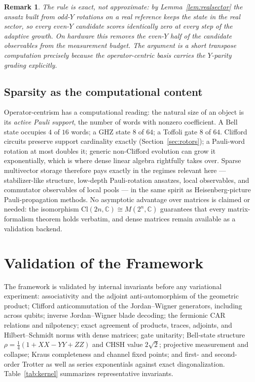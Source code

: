 \documentclass[11pt]{article}
\newcommand{\Cl}{\mathrm{Cl}}
\newcommand{\C}{\mathbb{C}}
\newtheorem{remark}{Remark}
\begin{document}
\begin{remark}
The rule is exact, not approximate: by Lemma~\ref{lem:realsector} the ansatz built from odd-$Y$ rotations on a real reference keeps the state in the real sector, so every even-$Y$ candidate scores identically zero at every step of the adaptive growth.  On hardware this removes the even-$Y$ half of the candidate observables from the measurement budget.  The argument is a short transpose computation precisely because the operator-centric basis carries the $Y$-parity grading explicitly.
\end{remark}

\subsection{Sparsity as the computational content}

Operator-centrism has a computational reading: the natural size of an object is its \emph{active Pauli support}, the number of words with nonzero coefficient.  A Bell state occupies $4$ of $16$ words; a GHZ state $8$ of $64$; a Toffoli gate $8$ of $64$.  Clifford circuits preserve support cardinality exactly (Section~\ref{sec:rotors}); a Pauli-word rotation at most doubles it; generic non-Clifford evolution can grow it exponentially, which is where dense linear algebra rightfully takes over.  Sparse multivector storage therefore pays exactly in the regimes relevant here --- stabilizer-like structure, low-depth Pauli-rotation ansatzes, local observables, and commutator observables of local pools --- in the same spirit as Heisenberg-picture Pauli-propagation methods.  No asymptotic advantage over matrices is claimed or needed: the isomorphism $\Cl(2n,\C)\cong M(2^n,\C)$ guarantees that every matrix-formalism theorem holds verbatim, and dense matrices remain available as a validation backend.

\section{Validation of the Framework}

The framework is validated by internal invariants before any variational experiment: associativity and the adjoint anti-automorphism of the geometric product; Clifford anticommutation of the Jordan--Wigner generators, including across qubits; inverse Jordan--Wigner blade decoding; the fermionic CAR relations and nilpotency; exact agreement of products, traces, adjoints, and Hilbert--Schmidt norms with dense matrices; gate unitarity; Bell-state structure $\rho=\tfrac14(1+XX-YY+ZZ)$ and CHSH value $2\sqrt2$; projective measurement and collapse; Kraus completeness and channel fixed points; and first- and second-order Trotter as well as series exponentials against exact diagonalization.  Table~\ref{tab:kernel} summarizes representative invariants.
\end{document}
